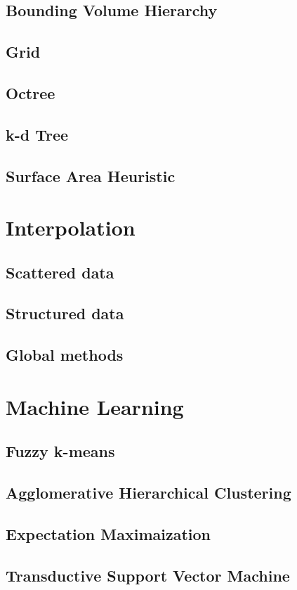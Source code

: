 \subsection{Bounding Volume Hierarchy}
\subsection{Grid}
\subsection{Octree}
\subsection{k-d Tree}
\subsection{Surface Area Heuristic}

\section{Interpolation}
\subsection{Scattered data}
\subsection{Structured data}

\label{ch:fu:trilinear}
\subsection{Global methods}


\section{Machine Learning}

\subsection{Fuzzy k-means}
\subsection{Agglomerative Hierarchical Clustering}
\subsection{Expectation Maximaization}
\subsection{Transductive Support Vector Machine}